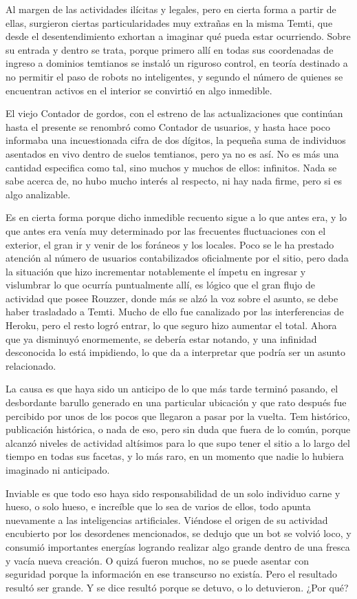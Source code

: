 \documentclass[
]{book}
\begin{document}
Al margen de las actividades ilícitas y legales, pero en cierta forma a partir de ellas, surgieron ciertas particularidades muy extrañas en la misma Temti, que desde el desentendimiento exhortan a imaginar qué pueda estar ocurriendo. Sobre su entrada y dentro se trata, porque primero allí en todas sus coordenadas de ingreso a dominios temtianos se instaló un riguroso control, en teoría destinado a no permitir el paso de robots no inteligentes, y segundo el número de quienes se encuentran activos en el interior se convirtió en algo inmedible.

El viejo Contador de gordos, con el estreno de las actualizaciones que continúan hasta el presente se renombró como Contador de usuarios, y hasta hace poco informaba una incuestionada cifra de dos dígitos, la pequeña suma de individuos asentados en vivo dentro de suelos temtianos, pero ya no es así. No es más una cantidad especifica como tal, sino muchos y muchos de ellos: infinitos. Nada se sabe acerca de, no hubo mucho interés al respecto, ni hay nada firme, pero si es algo analizable.

Es en cierta forma porque dicho inmedible recuento sigue a lo que antes era, y lo que antes era venía muy determinado por las frecuentes fluctuaciones con el exterior, el gran ir y venir de los foráneos y los locales. Poco se le ha prestado atención al número de usuarios contabilizados oficialmente por el sitio, pero dada la situación que hizo incrementar notablemente el ímpetu en ingresar y vislumbrar lo que ocurría puntualmente allí, es lógico que el gran flujo de actividad que posee Rouzzer, donde más se alzó la voz sobre el asunto, se debe haber trasladado a Temti. Mucho de ello fue canalizado por las interferencias de Heroku, pero el resto logró entrar, lo que seguro hizo aumentar el total. Ahora que ya disminuyó enormemente, se debería estar notando, y una infinidad desconocida lo está impidiendo, lo que da a interpretar que podría ser un asunto relacionado.

La causa es que haya sido un anticipo de lo que más tarde terminó pasando, el desbordante barullo generado en una particular ubicación y que rato después fue percibido por unos de los pocos que llegaron a pasar por la vuelta. Tem histórico, publicación histórica, o nada de eso, pero sin duda que fuera de lo común, porque alcanzó niveles de actividad altísimos para lo que supo tener el sitio a lo largo del tiempo en todas sus facetas, y lo más raro, en un momento que nadie lo hubiera imaginado ni anticipado.

Inviable es que todo eso haya sido responsabilidad de un solo individuo carne y hueso, o solo hueso, e increíble que lo sea de varios de ellos, todo apunta nuevamente a las inteligencias artificiales. Viéndose el origen de su actividad encubierto por los desordenes mencionados, se dedujo que un bot se volvió loco, y consumió importantes energías logrando realizar algo grande dentro de una fresca y vacía nueva creación. O quizá fueron muchos, no se puede asentar con seguridad porque la información en ese transcurso no existía. Pero el resultado resultó ser grande. Y se dice resultó porque se detuvo, o lo detuvieron. ¿Por qué?
\end{document}
